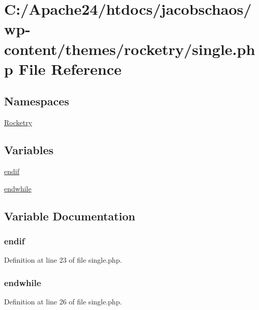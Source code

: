 \hypertarget{single_8php}{}\section{C\+:/\+Apache24/htdocs/jacobschaos/wp-\/content/themes/rocketry/single.php File Reference}
\label{single_8php}
\subsection*{Namespaces}
\begin{DoxyCompactItemize}
\item 
 \hyperlink{namespace_rocketry}{Rocketry}
\end{DoxyCompactItemize}
\subsection*{Variables}
\begin{DoxyCompactItemize}
\item 
\hyperlink{single_8php_a82cd33ca97ff99f2fcc5e9c81d65251b}{endif}
\item 
\hyperlink{single_8php_a1b05dae45f9e3f4c1fe86048550d2c5b}{endwhile}
\end{DoxyCompactItemize}


\subsection{Variable Documentation}
\hypertarget{single_8php_a82cd33ca97ff99f2fcc5e9c81d65251b}{}
\subsubsection[{endif}]{\setlength{\rightskip}{0pt plus 5cm}endif}\label{single_8php_a82cd33ca97ff99f2fcc5e9c81d65251b}


Definition at line 23 of file single.\+php.

\hypertarget{single_8php_a1b05dae45f9e3f4c1fe86048550d2c5b}{}
\subsubsection[{endwhile}]{\setlength{\rightskip}{0pt plus 5cm}endwhile}\label{single_8php_a1b05dae45f9e3f4c1fe86048550d2c5b}


Definition at line 26 of file single.\+php.

